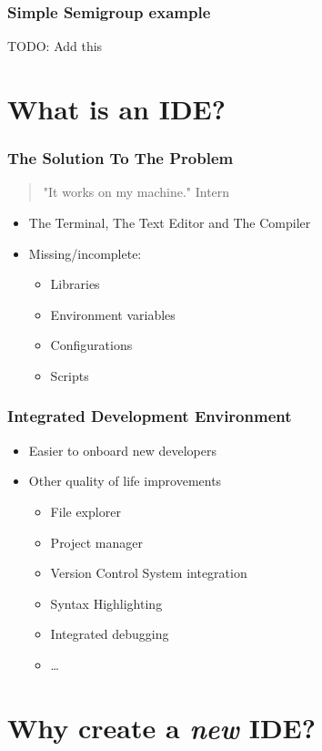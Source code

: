 \begin{frame}
    \frametitle{Simple Semigroup example}
    TODO: Add this
\end{frame}

\section{What is an IDE?}
\SectionPage

\begin{frame}
  \frametitle{The Solution To The Problem}
  \begin{quote}
    "It works on my machine." \textemdash Intern
  \end{quote}
  \begin{itemize}
    \item The Terminal, The Text Editor and The Compiler
    \pause
    \item Missing/incomplete:
    \begin{itemize}
      \item Libraries
      \item Environment variables
      \item Configurations
      \item Scripts
    \end{itemize}
  \end{itemize}
\end{frame}

\begin{frame}
  \frametitle{Integrated Development Environment}
  \begin{itemize}
    \item Easier to onboard new developers
    \item Other quality of life improvements
    \begin{itemize}
      \item File explorer
      \item Project manager
      \item Version Control System integration
      \item Syntax Highlighting
      \item Integrated debugging
      \item \dots
    \end{itemize}
  \end{itemize}
\end{frame}

\section{Why create a \textit{new} IDE?}
\SectionPage

